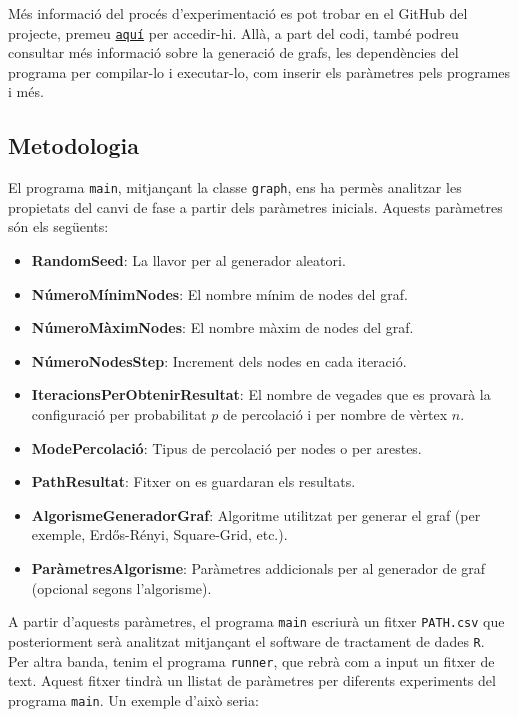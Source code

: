 \documentclass[a4paper]{article}
\begin{document}
	Més informació del procés d'experimentació es pot trobar en el GitHub del projecte, premeu \href{https://github.com/Willyllem88/PercolationConnectivity}{\texttt{aquí}} per accedir-hi. Allà, a part del codi, també podreu consultar més informació sobre la generació de grafs, les dependències del programa per compilar-lo i executar-lo, com inserir els paràmetres pels programes i més. \\
	
	\subsection{Metodologia}
	
	El programa \texttt{main}, mitjançant la classe \texttt{graph}, ens ha permès analitzar les propietats del canvi de fase a partir dels paràmetres inicials. Aquests paràmetres són els següents:
	
	\begin{itemize}
		\item \textbf{RandomSeed}: La llavor per al generador aleatori.
		\item \textbf{NúmeroMínimNodes}: El nombre mínim de nodes del graf.
		\item \textbf{NúmeroMàximNodes}: El nombre màxim de nodes del graf.
		\item \textbf{NúmeroNodesStep}: Increment dels nodes en cada iteració.
		\item \textbf{IteracionsPerObtenirResultat}: El nombre de vegades que es provarà la configuració per probabilitat $p$ de percolació i per nombre de vèrtex $n$.
		\item \textbf{ModePercolació}: Tipus de percolació per nodes o per arestes.
		\item \textbf{PathResultat}: Fitxer on es guardaran els resultats.
		\item \textbf{AlgorismeGeneradorGraf}: Algoritme utilitzat per generar el graf (per exemple, Erdős-Rényi, Square-Grid, etc.).
		\item \textbf{ParàmetresAlgorisme}: Paràmetres addicionals per al generador de graf (opcional segons l'algorisme).
	\end{itemize}
	
	A partir d'aquests paràmetres, el programa \texttt{main} escriurà un fitxer \texttt{PATH.csv} que posteriorment serà analitzat mitjançant el software de tractament de dades \texttt{R}. \\
	
	Per altra banda, tenim el programa \texttt{runner}, que rebrà com a input un fitxer de text. Aquest fitxer tindrà un llistat de paràmetres per diferents experiments del programa \texttt{main}. Un exemple d'això seria:
	
\end{document}
